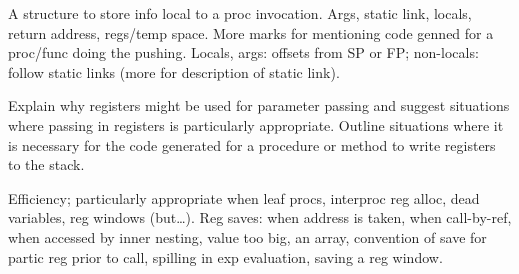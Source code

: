 \documentclass[11pt]{cityexam}
\begin{document}
\begin{questions}
\begin{subquestions}
\begin{modelanswer}
A structure to store info local to a proc invocation.
Args, static link, locals, return address, regs/temp space.
More marks for mentioning code genned for a proc/func doing the
pushing.
Locals, args: offsets from SP or FP; non-locals: follow static links
(more for description of static link).
\end{modelanswer}

\subquestion
Explain why registers might be used for parameter passing and
suggest situations where passing in registers is particularly
appropriate. 
Outline situations where it is necessary for the code generated for a 
procedure or method to write registers to the stack.

\begin{modelanswer}
Efficiency; particularly appropriate when leaf procs, interproc
reg alloc, dead variables, reg windows (but\ldots).
Reg saves: when address is taken,
when call-by-ref,
when accessed by inner nesting,
value too big,
an array,
convention of save for partic reg prior to call,
spilling in exp evaluation,
saving a reg window.
\end{modelanswer}

\end{subquestions}


\end{questions}
\end{document}
